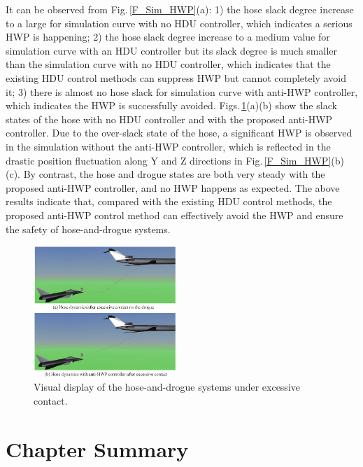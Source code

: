 It can be observed from Fig.\,\ref{F_Sim_HWP}(a): 1) the hose
slack degree increase to a large for simulation curve with no HDU
controller, which indicates a serious HWP is happening; 2) the hose
slack degree increase to a medium value for simulation curve with
an HDU controller but its slack degree is much smaller than the simulation
curve with no HDU controller, which indicates that the existing HDU
control methods can suppress HWP but cannot completely avoid it; 3)
there is almost no hose slack for simulation curve with anti-HWP controller,
which indicates the HWP is successfully avoided. Figs.\,\ref{F_HWPVR}(a)(b)
show the slack states of the hose with no HDU controller and with
the proposed anti-HWP controller. Due to the over-slack state of the
hose, a significant HWP is observed in the simulation without the
anti-HWP controller, which is reflected in the drastic position fluctuation
along Y and Z directions in Fig.\,\ref{F_Sim_HWP}(b)(c). By contrast,
the hose and drogue states are both very steady with the proposed
anti-HWP controller, and no HWP happens as expected. The above results
indicate that, compared with the existing HDU control methods, the
proposed anti-HWP control method can effectively avoid the HWP and
ensure the safety of hose-and-drogue systems.

\begin{figure}[ptbh]
	\begin{centering}
		\includegraphics[width=0.48\textwidth]{Figures/Figs_Ch8/Fig18}
		\par\end{centering}
	\caption{Visual display of the hose-and-drogue systems under excessive contact.}
	\label{F_HWPVR}
\end{figure}


\section{Chapter Summary}

